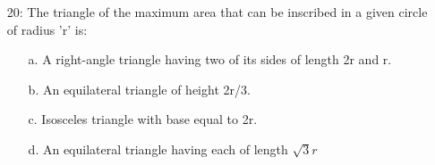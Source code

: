 \documentclass[journal,12pt,twocolumn]{IEEEtran}
\theoremstyle{remark}
\begin{document}
\begin{enumerate}
\begin{multicols}{2}
\begin{enumerate}
    \item [a.] $2e^{e^x-1}-1$
    \item [b.] $e^{e^x-1}$
	    \columnbreak
    \item [c.] $2e^{e^x}-1$
    \item [d.] $e^{e^x}-1$
\end{enumerate}
\end{multicols}
\item[20:] The triangle of the maximum area that can be inscribed in a given circle of radius 'r' is:
\begin{enumerate}
    \item [a.] A right-angle triangle having two of its sides of length 2r and r.
    \item [b.] An equilateral triangle of height 2r/3.
    \item [c.] Isosceles triangle with base equal to 2r.
    \item [d.] An equilateral triangle having each of length $\sqrt{3}r$
\end{enumerate}

\end{enumerate}
\end{document}
